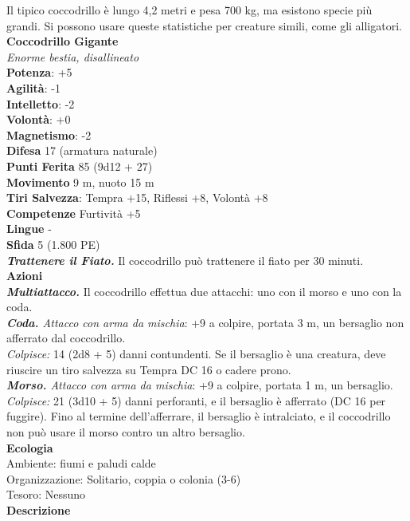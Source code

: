 \begin{multicols}{2}
Il tipico coccodrillo è lungo 4,2 metri e pesa 700 kg, ma esistono specie più grandi. Si possono usare queste statistiche per creature simili, come gli alligatori. \\


\medskip\textbf{Coccodrillo Gigante}\\
\emph{Enorme bestia, disallineato}\\
\textbf{Potenza}: +5\\
\textbf{Agilità}: -1\\
\textbf{Intelletto}: -2\\
\textbf{Volontà}: +0\\
\textbf{Magnetismo}: -2\\
\textbf{Difesa} 17 (armatura naturale)\\
\textbf{Punti Ferita} 85 (9d12 + 27)\\
\textbf{Movimento} 9 m, nuoto 15 m\\
\textbf{Tiri Salvezza}: Tempra +15, Riflessi +8, Volontà +8 \\
\textbf{Competenze} Furtività +5\\
\textbf{Lingue} -\\
\textbf{Sfida} 5 (1.800 PE)\smallskip\\
\emph{\textbf{Trattenere il Fiato.}} Il coccodrillo può trattenere il fiato per 30 minuti.\\
\smallskip\textbf{Azioni}\\
\emph{\textbf{Multiattacco.}} Il coccodrillo effettua due attacchi: uno con il morso e uno con la coda.\\
\emph{\textbf{Coda.} Attacco con arma da mischia}: +9 a colpire, portata 3 m, un bersaglio non afferrato dal coccodrillo.\\
\emph{Colpisce:} 14 (2d8 + 5) danni contundenti. Se il bersaglio è una creatura, deve riuscire un tiro salvezza su Tempra DC 16 o cadere prono.\\
\emph{\textbf{Morso.} Attacco con arma da mischia}: +9 a colpire, portata 1 m, un bersaglio.\\
\emph{Colpisce:} 21 (3d10 + 5) danni perforanti, e il bersaglio è afferrato (DC 16 per fuggire). Fino al termine dell'afferrare, il bersaglio è intralciato, e il coccodrillo non può usare il morso contro un altro bersaglio.\\
\textbf{Ecologia}\\
Ambiente: fiumi e paludi calde\\
Organizzazione: Solitario, coppia o colonia (3-6)\\
Tesoro: Nessuno\\
\textbf{Descrizione}\\


\end{multicols}
